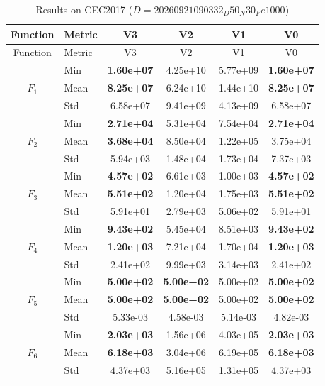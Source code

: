 \begin{center}
\small
\renewcommand{\arraystretch}{1.25}
\begin{longtable}{clcccc}
\caption{Results on CEC2017 ($D=20260921090332_D50_N30_Fe1000$) }
\label{tab:results_CEC2017_20260921090332_D50_N30_Fe1000} \\
\toprule
Function & Metric & V3 & V2 & V1 & V0 \\
\midrule
\endfirsthead
\toprule
Function & Metric & V3 & V2 & V1 & V0 \\
\midrule
\endhead
\multirow{3}{*}{$F_{1}$} & Min & \textbf{1.60e+07} & 4.25e+10 & 5.77e+09 & \textbf{1.60e+07} \\
 & Mean & \textbf{8.25e+07} & 6.24e+10 & 1.44e+10 & \textbf{8.25e+07} \\
 & Std & 6.58e+07 & 9.41e+09 & 4.13e+09 & 6.58e+07 \\
\midrule
\multirow{3}{*}{$F_{2}$} & Min & \textbf{2.71e+04} & 5.31e+04 & 7.54e+04 & \textbf{2.71e+04} \\
 & Mean & \textbf{3.68e+04} & 8.50e+04 & 1.22e+05 & 3.75e+04 \\
 & Std & 5.94e+03 & 1.48e+04 & 1.73e+04 & 7.37e+03 \\
\midrule
\multirow{3}{*}{$F_{3}$} & Min & \textbf{4.57e+02} & 6.61e+03 & 1.00e+03 & \textbf{4.57e+02} \\
 & Mean & \textbf{5.51e+02} & 1.20e+04 & 1.75e+03 & \textbf{5.51e+02} \\
 & Std & 5.91e+01 & 2.79e+03 & 5.06e+02 & 5.91e+01 \\
\midrule
\multirow{3}{*}{$F_{4}$} & Min & \textbf{9.43e+02} & 5.45e+04 & 8.51e+03 & \textbf{9.43e+02} \\
 & Mean & \textbf{1.20e+03} & 7.21e+04 & 1.70e+04 & \textbf{1.20e+03} \\
 & Std & 2.41e+02 & 9.99e+03 & 3.14e+03 & 2.41e+02 \\
\midrule
\multirow{3}{*}{$F_{5}$} & Min & \textbf{5.00e+02} & \textbf{5.00e+02} & 5.00e+02 & \textbf{5.00e+02} \\
 & Mean & \textbf{5.00e+02} & \textbf{5.00e+02} & 5.00e+02 & \textbf{5.00e+02} \\
 & Std & 5.33e-03 & 4.58e-03 & 5.14e-03 & 4.82e-03 \\
\midrule
\multirow{3}{*}{$F_{6}$} & Min & \textbf{2.03e+03} & 1.56e+06 & 4.03e+05 & \textbf{2.03e+03} \\
 & Mean & \textbf{6.18e+03} & 3.04e+06 & 6.19e+05 & \textbf{6.18e+03} \\
 & Std & 4.37e+03 & 5.16e+05 & 1.31e+05 & 4.37e+03 \\

\end{longtable}
\end{center}
